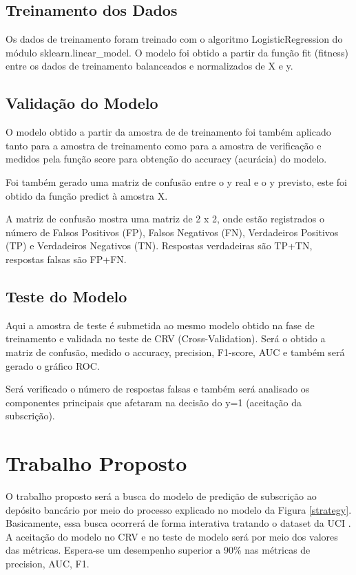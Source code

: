 \documentclass[twoside,conference,a4paper]{IEEEtran}
\begin{document}
\subsection{Treinamento dos Dados}

Os dados de treinamento foram treinado com o algoritmo LogisticRegression do módulo sklearn.linear\_model. O modelo foi obtido a partir da função fit (fitness) entre os dados de treinamento balanceados e normalizados de X e y.


\subsection{Validação do Modelo}

O modelo obtido a partir da amostra de de treinamento foi também aplicado tanto para a amostra de treinamento como para a amostra de verificação e medidos pela função score para obtenção do accuracy (acurácia) do modelo.

Foi também gerado uma matriz de confusão entre o y real e o y previsto, este foi obtido da função predict à amostra X.

A matriz de confusão mostra uma matriz de 2 x 2, onde estão registrados o número de Falsos Positivos (FP), Falsos Negativos (FN), Verdadeiros Positivos (TP) e Verdadeiros Negativos (TN). Respostas verdadeiras são TP+TN, respostas falsas são FP+FN.

\subsection{Teste do Modelo}

Aqui a amostra de teste é submetida ao mesmo modelo obtido na fase de treinamento e validada no teste de CRV (Cross-Validation). Será o obtido a matriz de confusão, medido o accuracy, precision, F1-score, AUC e também será gerado o gráfico ROC.

Será verificado o número de respostas falsas e também será analisado os componentes principais que afetaram na decisão do y=1 (aceitação da subscrição).

\section{Trabalho Proposto}
O trabalho proposto será a busca do modelo de predição de subscrição ao depósito bancário por meio do processo explicado no modelo da Figura \ref{strategy}. Basicamente, essa busca ocorrerá de forma interativa tratando o dataset da UCI \cite{UCI:2014}. A aceitação do modelo no CRV e no teste de modelo será por meio dos valores das métricas. Espera-se um desempenho superior a 90\% nas métricas de precision, AUC, F1.
\end{document}

